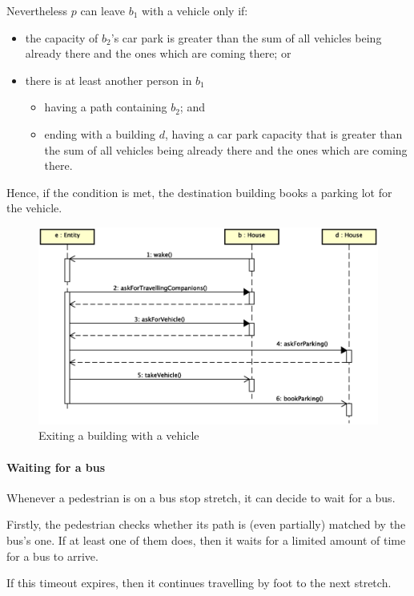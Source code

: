 Nevertheless $p$ can leave $b_1$ with a vehicle only if:
\begin{itemize}
\item the capacity of $b_2$'s car park is greater than the sum of all
vehicles being already there and the ones which are coming there; or
\item there is at least another person in $b_1$
  \begin{itemize}
  \item having a path containing $b_2$; and
  \item ending with a building $d$, having a car park capacity that is
    greater than the sum of all vehicles being already there and the ones
    which are coming there.
  \end{itemize}
\end{itemize}
Hence, if the condition is met, the destination building books
a parking lot for the vehicle.

\begin{figure}[H]
\centering
\includegraphics[width=\columnwidth,trim=1 0 0 0,clip]
  {images/solution/going_out_with_vehicle.eps}
\caption{Exiting a building with a vehicle}
\label{fig:app-inter-vehicle}
\end{figure}

\paragraph{Waiting for a bus}
Whenever a pedestrian is on a bus stop stretch, it can decide to wait for a
bus.

Firstly, the pedestrian checks whether its path is (even partially) matched by
the bus's one.
If at least one of them does, then it waits for a limited amount of time for a
bus to arrive.

If this timeout expires, then it continues travelling by foot to the next
stretch.


